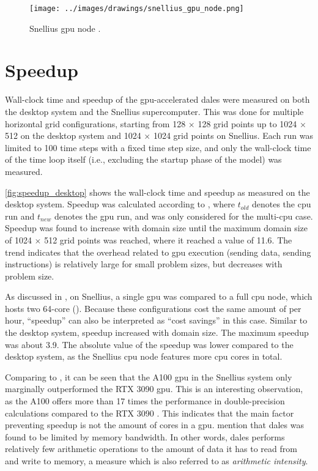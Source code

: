 \begin{figure}
    \centering
    \texttt{[image: ../images/drawings/snellius\_gpu\_node.png]}
    \caption{Snellius \acrshort{gpu} node \citep{wattsLenovoThinkSystemSD650N2024}.}
    \label{fig:gpu_node}
\end{figure}

\section{Speedup} \label{sec:speedup}
Wall-clock time and speedup of the \acrshort{gpu}-accelerated \acrshort{dales} were measured on both the desktop system and the Snellius supercomputer. This was done for multiple horizontal grid configurations, starting from 128 $\times$ 128 grid points up to 1024 $\times$ 512 on the desktop system and 1024 $\times$ 1024 grid points on Snellius. Each run was limited to 100 time steps with a fixed time step size, and only the wall-clock time of the time loop itself (i.e., excluding the startup phase of the model) was measured.

\autoref{fig:speedup_desktop} shows the wall-clock time and speedup as measured on the desktop system. Speedup was calculated according to , where $t_{old}$ denotes the \acrshort{cpu} run and $t_{new}$ denotes the \acrshort{gpu} run, and was only considered for the multi-\acrshort{cpu} case. Speedup was found to increase with domain size until the maximum domain size of 1024 $\times$ 512 grid points was reached, where it reached a value of 11.6. The trend indicates that the overhead related to \acrshort{gpu} execution (sending data, sending instructions) is relatively large for small problem sizes, but decreases with problem size.

As discussed in , on Snellius, a single \acrshort{gpu} was compared to a full \acrshort{cpu} node, which hosts two 64-core  (). Because these configurations cost the same amount of  per hour, ``speedup'' can also be interpreted as ``cost savings'' in this case. Similar to the desktop system, speedup increased with domain size. The maximum speedup was about 3.9. The absolute value of the speedup was lower compared to the desktop system, as the Snellius \acrshort{cpu} node features more \acrshort{cpu} cores in total.

Comparing  to , it can be seen that the A100 \acrshort{gpu} in the Snellius system only marginally outperformed the RTX 3090 \acrshort{gpu}. This is an interesting observation, as the A100 offers more than 17 times the performance in double-precision calculations compared to the RTX 3090 \citep{nvidiaNVIDIAA100Tensor2020,nvidiaNVIDIAAmpereGA1022021}. This indicates that the main factor preventing speedup is not the amount of cores in a \acrshort{gpu}. \citet{janssonCloudBotanyShallow2023} mention that \acrshort{dales} was found to be limited by memory bandwidth. In other words, \acrshort{dales} performs relatively few arithmetic operations to the amount of data it has to read from and write to memory, a measure which is also referred to as \emph{arithmetic intensity}.


